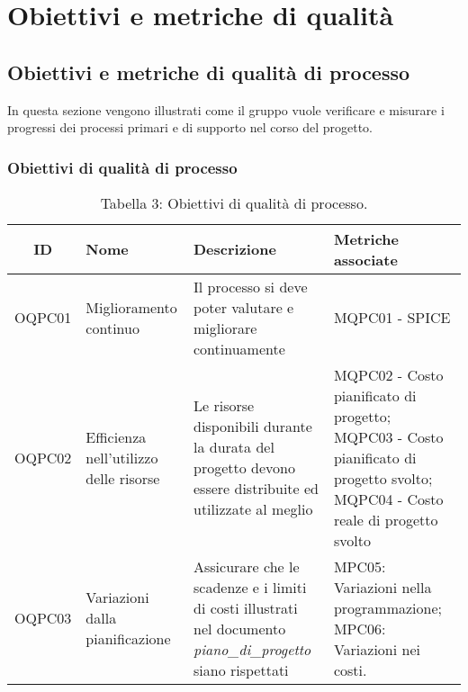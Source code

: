 \section{Obiettivi e metriche di qualità}
\subsection{Obiettivi e metriche di qualità di processo}
In questa sezione vengono illustrati come il gruppo vuole verificare e misurare i progressi dei processi primari e di supporto nel corso del progetto. 
\subsubsection{Obiettivi di qualità di processo}
\begin{table}[H]
	\centering
	\begin{tabularx}{\textwidth}{|c|X|X|X|}
	\hline
	\textbf{ID} & \textbf{Nome} & \textbf{Descrizione} & \textbf{Metriche associate}\\
	\hline
	OQPC01 & Miglioramento continuo & Il processo si deve poter valutare e migliorare continuamente & MQPC01 - SPICE\\
	\hline
	OQPC02 & Efficienza nell'utilizzo delle risorse & Le risorse disponibili durante la durata del progetto devono essere distribuite ed utilizzate al meglio & MQPC02 - Costo pianificato di progetto; MQPC03 - Costo pianificato di progetto svolto; \hspace{25pt} MQPC04 - Costo reale di progetto svolto \\
	\hline
	OQPC03 & Variazioni dalla pianificazione & Assicurare che le scadenze e i limiti di costi illustrati nel documento \textit{piano\_di\_progetto} siano rispettati &  MPC05: Variazioni nella programmazione;\hspace{65pt} MPC06: Variazioni nei costi. \\
	\hline
	\end{tabularx}
	\caption{Tabella 3: Obiettivi di qualità di processo.}
\end{table}

